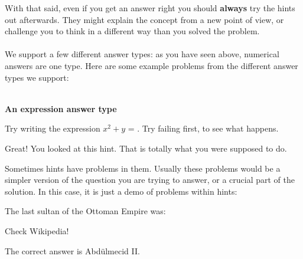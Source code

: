 \documentclass{ximera}
\begin{document}
With that said, even if you get an answer right you should \textbf{always} try the
hints out afterwards.  They might explain the concept from a new point
of view, or challenge you to think in a different way than you solved
the problem.
\\
\\
We support a few different answer types: as you have seen above,
numerical answers are one type.  Here are some example problems from
the different answer types we support:
\\
\\
\begin{question}

  \textbf{An expression answer type}

Try writing the expression $x^2+y$ = .  Try failing first, to see what happens.

    \begin{hint}
      Great!  You looked at this hint.  That is totally what you were supposed to do.
    \end{hint}

    \begin{hint}
      Sometimes hints have problems in them.  Usually these problems would be a simpler version of the question you are trying to answer, or a crucial part of the solution.  In this case, it is just a demo of problems within hints:
      

	\begin{question}

        The last sultan of the Ottoman Empire was:
	
	\begin{multipleChoice}
	\end{multipleChoice}

          \begin{hint}
            Check Wikipedia!
          \end{hint}

          \begin{hint}
            The correct answer is Abdülmecid II.
          \end{hint}

 	\end{question}

    \end{hint}

\end{question}
\end{document}
